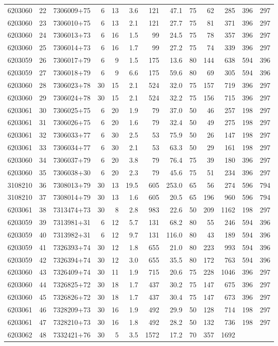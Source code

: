 \documentclass[
]{article}
\begin{document}
\begin{longtable}[]{@{}rrlrrrrrrrrrr@{}}
6203060 & 22 & 7306009+75 & 6 & 13 & 3.6 & 121 & 47.1 & 75 & 62 & 285 &
396 & 297\tabularnewline
6203060 & 23 & 7306010+75 & 6 & 13 & 2.1 & 121 & 27.7 & 75 & 81 & 371 &
396 & 297\tabularnewline
6203060 & 24 & 7306013+73 & 6 & 16 & 1.5 & 99 & 24.5 & 75 & 78 & 357 &
396 & 297\tabularnewline
6203060 & 25 & 7306014+73 & 6 & 16 & 1.7 & 99 & 27.2 & 75 & 74 & 339 &
396 & 297\tabularnewline
6203059 & 26 & 7306017+79 & 6 & 9 & 1.5 & 175 & 13.6 & 80 & 144 & 638 &
594 & 396\tabularnewline
6203059 & 27 & 7306018+79 & 6 & 9 & 6.6 & 175 & 59.6 & 80 & 69 & 305 &
594 & 396\tabularnewline
6203060 & 28 & 7306023+78 & 30 & 15 & 2.1 & 524 & 32.0 & 75 & 157 & 719
& 396 & 297\tabularnewline
6203060 & 29 & 7306024+78 & 30 & 15 & 2.1 & 524 & 32.2 & 75 & 156 & 715
& 396 & 297\tabularnewline
6203061 & 30 & 7306025+75 & 6 & 20 & 1.9 & 79 & 37.0 & 50 & 46 & 257 &
198 & 297\tabularnewline
6203061 & 31 & 7306026+75 & 6 & 20 & 1.6 & 79 & 32.4 & 50 & 49 & 275 &
198 & 297\tabularnewline
6203061 & 32 & 7306033+77 & 6 & 30 & 2.5 & 53 & 75.9 & 50 & 26 & 147 &
198 & 297\tabularnewline
6203061 & 33 & 7306034+77 & 6 & 30 & 2.1 & 53 & 63.3 & 50 & 29 & 161 &
198 & 297\tabularnewline
6203060 & 34 & 7306037+79 & 6 & 20 & 3.8 & 79 & 76.4 & 75 & 39 & 180 &
396 & 297\tabularnewline
6203060 & 35 & 7306038+30 & 6 & 20 & 2.3 & 79 & 45.6 & 75 & 51 & 234 &
396 & 297\tabularnewline
3108210 & 36 & 7308013+79 & 30 & 13 & 19.5 & 605 & 253.0 & 65 & 56 & 274
& 596 & 794\tabularnewline
3108210 & 37 & 7308014+79 & 30 & 13 & 1.6 & 605 & 20.5 & 65 & 196 & 960
& 596 & 794\tabularnewline
6203061 & 38 & 7313474+73 & 30 & 8 & 2.8 & 983 & 22.6 & 50 & 209 & 1162
& 198 & 297\tabularnewline
6203059 & 39 & 7313981+31 & 6 & 12 & 5.7 & 131 & 68.2 & 80 & 55 & 246 &
594 & 396\tabularnewline
6203059 & 40 & 7313982+31 & 6 & 12 & 9.7 & 131 & 116.0 & 80 & 43 & 189 &
594 & 396\tabularnewline
6203059 & 41 & 7326393+74 & 30 & 12 & 1.8 & 655 & 21.0 & 80 & 223 & 993
& 594 & 396\tabularnewline
6203059 & 42 & 7326394+74 & 30 & 12 & 3.0 & 655 & 35.5 & 80 & 172 & 763
& 594 & 396\tabularnewline
6203060 & 43 & 7326409+74 & 30 & 11 & 1.9 & 715 & 20.6 & 75 & 228 & 1046
& 396 & 297\tabularnewline
6203060 & 44 & 7326825+72 & 30 & 18 & 1.7 & 437 & 30.2 & 75 & 147 & 675
& 396 & 297\tabularnewline
6203060 & 45 & 7326826+72 & 30 & 18 & 1.7 & 437 & 30.4 & 75 & 147 & 673
& 396 & 297\tabularnewline
6203061 & 46 & 7328209+73 & 30 & 16 & 1.9 & 492 & 29.9 & 50 & 128 & 714
& 198 & 297\tabularnewline
6203061 & 47 & 7328210+73 & 30 & 16 & 1.8 & 492 & 28.2 & 50 & 132 & 736
& 198 & 297\tabularnewline
6203062 & 48 & 7332421+76 & 30 & 5 & 3.5 & 1572 & 17.2 & 70 & 357 & 1692

\end{longtable}
\end{document}
